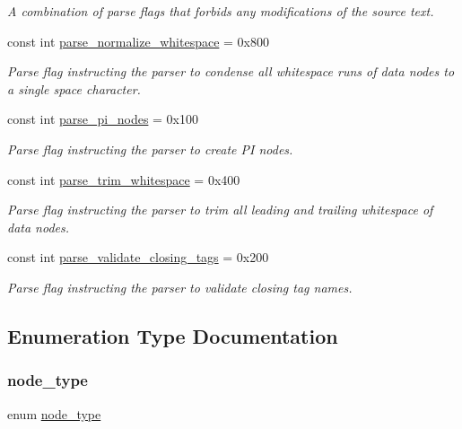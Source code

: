 \begin{DoxyCompactItemize}
\begin{DoxyCompactList}\small\item\em A combination of parse flags that forbids any modifications of the source text. \end{DoxyCompactList}\item 
const int \mbox{\hyperlink{namespacerapidxml_a88f95d4e275ba01408fefde83078651b}{parse\+\_\+normalize\+\_\+whitespace}} = 0x800
\begin{DoxyCompactList}\small\item\em Parse flag instructing the parser to condense all whitespace runs of data nodes to a single space character. \end{DoxyCompactList}\item 
const int \mbox{\hyperlink{namespacerapidxml_a1c20b2b2b75711cd76423e119c49f830}{parse\+\_\+pi\+\_\+nodes}} = 0x100
\begin{DoxyCompactList}\small\item\em Parse flag instructing the parser to create PI nodes. \end{DoxyCompactList}\item 
const int \mbox{\hyperlink{namespacerapidxml_aac1f06b1afd47b812732fb521b146fd9}{parse\+\_\+trim\+\_\+whitespace}} = 0x400
\begin{DoxyCompactList}\small\item\em Parse flag instructing the parser to trim all leading and trailing whitespace of data nodes. \end{DoxyCompactList}\item 
const int \mbox{\hyperlink{namespacerapidxml_aa5daff9d61c7d4eaf98e4d42efe628ee}{parse\+\_\+validate\+\_\+closing\+\_\+tags}} = 0x200
\begin{DoxyCompactList}\small\item\em Parse flag instructing the parser to validate closing tag names. \end{DoxyCompactList}\end{DoxyCompactItemize}


\subsection{Enumeration Type Documentation}
\mbox{\label{namespacerapidxml_a6a276b85e2da28c5f9c3dbce61c55682}} 
\subsubsection{\texorpdfstring{node\+\_\+type}{node\_type}}
{\footnotesize\ttfamily enum \mbox{\hyperlink{namespacerapidxml_a6a276b85e2da28c5f9c3dbce61c55682}{node\+\_\+type}}}



